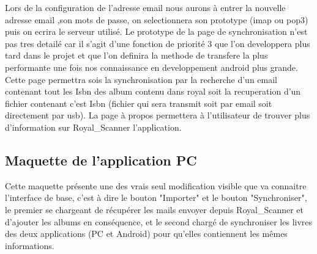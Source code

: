 Lors de la configuration de l'adresse email nous aurons à entrer la nouvelle adresse email ,son mots de passe, on selectionnera son prototype (imap ou pop3) puis on ecrira le serveur utilisé.
Le prototype de la page de synchronisation n'est pas tres detailé car il s'agit d'une fonction de priorité 3 que l'on developpera plus tard dans le projet et que l'on definira la methode de transfere la plus performante une fois nos connaissance en developpement android plus grande. 
Cette page permettra sois la synchronisation par la recherche d'un email contenant tout les Isbn des album contenu dans royal soit la recuperation d'un fichier contenant c'est Isbn (fichier qui sera transmit soit par email soit directement par usb).
La page à propos permettera à l'utilisateur de trouver plus d'information sur Royal\_Scanner l'application.

\newpage{}

\subsection{Maquette de l'application PC}

  \begin{figure}[htbp]
  \begin{center}
    \leavevmode
  \end{center}
\end{figure}

Cette maquette présente une des vrais seul modification visible que va connaitre l'interface de base, c'est à dire le bouton "Importer" et le bouton "Synchroniser", le premier se chargeant de récupérer les mails envoyer depuis Royal\_Scanner et d'ajouter les albums en conséquence, et le second chargé de synchroniser les livres des deux applications (PC et Android) pour qu'elles contiennent les mêmes informations.

